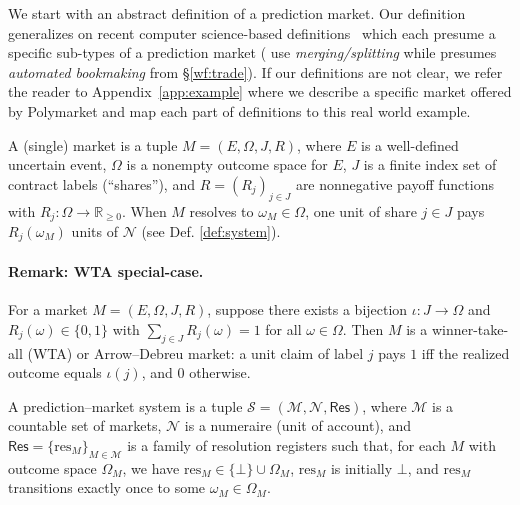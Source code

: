 
We start with an abstract definition of a prediction market. Our definition generalizes on recent computer science-based definitions~\cite{BMR17,FPW23,SGKS25} which each presume a specific sub-types of a prediction market (\eg \cite{BMR17,SGKS25} use \textit{merging/splitting} while \cite{FPW23} presumes \textit{automated bookmaking} from \S\ref{wf:trade}). If our definitions are not clear, we refer the reader to Appendix~\ref{app:example} where we describe a specific market offered by Polymarket and map each part of definitions to this real world example.

\begin{definition}[Market]\label{def:market}
A (single) market is a tuple $M=(E,\Omega,J,R)$, where $E$ is a well-defined uncertain event, $\Omega$ is a nonempty outcome space for $E$, $J$ is a finite index set of contract labels (“shares”), and $R=(R_j)_{j\in J}$ are nonnegative payoff functions with $R_j:\Omega\to\mathbb{R}_{\ge 0}$. When $M$ resolves to $\omega_M\in\Omega$, one unit of share $j\in J$ pays $R_j(\omega_M)$ units of $\mathcal{N}$ (see Def. \ref{def:system}).
\end{definition}

\paragraph{Remark: WTA special-case.}
For a market $M=(E,\Omega,J,R)$, suppose there exists a bijection $\iota:J\to\Omega$ and
$R_j(\omega)\in\{0,1\}$ with $\sum_{j\in J} R_j(\omega)=1$ for all $\omega\in\Omega$.
Then $M$ is a winner-take-all (WTA) or Arrow--Debreu market: a unit claim of label $j$ pays $1$ iff the realized outcome equals $\iota(j)$, and $0$ otherwise.

\begin{definition}\label{def:system}
A prediction--market system is a tuple $\mathcal{S}=(\mathcal{M},\mathcal{N},\mathsf{Res})$, where $\mathcal{M}$ is a countable set of markets, $\mathcal{N}$ is a numeraire (unit of account), and $\mathsf{Res}=\{\mathrm{res}_M\}_{M\in\mathcal{M}}$ is a family of resolution registers such that, for each $M$ with outcome space $\Omega_M$, we have $\mathrm{res}_M\in\{\bot\}\cup\Omega_M$, $\mathrm{res}_M$ is initially $\bot$, and $\mathrm{res}_M$ transitions exactly once to some $\omega_M\in\Omega_M$.
\end{definition}


